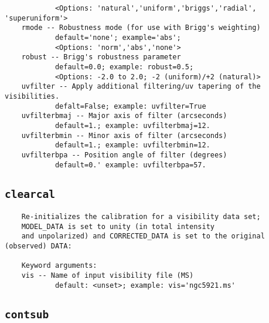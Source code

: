 \begin{verbatim}
            <Options: 'natural','uniform','briggs','radial', 'superuniform'>
    rmode -- Robustness mode (for use with Brigg's weighting)
            default='none'; example='abs'; 
            <Options: 'norm','abs','none'>
    robust -- Brigg's robustness parameter 
            default=0.0; example: robust=0.5; 
            <Options: -2.0 to 2.0; -2 (uniform)/+2 (natural)>
    uvfilter -- Apply additional filtering/uv tapering of the visibilities.
            defalt=False; example: uvfilter=True
    uvfilterbmaj -- Major axis of filter (arcseconds)
            default=1.; example: uvfilterbmaj=12.
    uvfilterbmin -- Minor axis of filter (arcseconds)
            default=1.; example: uvfilterbmin=12.
    uvfilterbpa -- Position angle of filter (degrees)
            default=0.' example: uvfilterbpa=57.
\end{verbatim}
\normalsize


\subsection{{\tt clearcal}}
\label{section:tasks.clearcal}

\small
\begin{verbatim}
    Re-initializes the calibration for a visibility data set;
    MODEL_DATA is set to unity (in total intensity 
    and unpolarized) and CORRECTED_DATA is set to the original (observed) DATA:
    
    Keyword arguments:
    vis -- Name of input visibility file (MS)
            default: <unset>; example: vis='ngc5921.ms'

\end{verbatim}
\normalsize


\subsection{{\tt contsub}}
\label{section:tasks.contsub}

